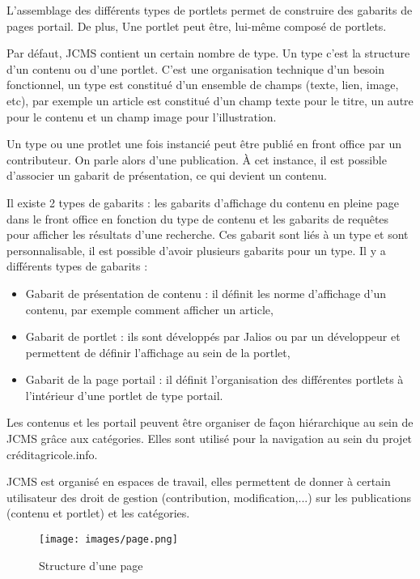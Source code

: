 \documentclass[12pt,a4paper]{article}
\begin{document}
L'assemblage des différents types de portlets permet de construire des gabarits de pages portail. De plus, Une portlet peut être, lui-même composé de portlets.\par 
Par défaut, JCMS contient un certain nombre de type. Un type c'est la structure d'un contenu ou d'une portlet. C'est une organisation technique d'un besoin fonctionnel, un type est constitué d'un ensemble de champs (texte, lien, image, etc), par exemple un article est constitué d'un champ texte pour le titre, un autre pour le contenu et un champ image pour l'illustration.\par 
Un type ou une protlet une fois instancié peut être publié en front office par un contributeur. On parle alors d'une publication. À cet instance, il est possible d'associer un gabarit de présentation, ce qui devient un contenu.\par
Il existe 2 types de gabarits : les gabarits d'affichage du contenu en pleine page dans le front office en fonction du type de contenu et les gabarits de requêtes pour afficher les résultats d'une recherche. Ces gabarit sont liés à un type et sont personnalisable, il est possible d'avoir plusieurs gabarits pour un type. Il y a différents types de gabarits :
\begin{itemize}
\item Gabarit de présentation de contenu : il définit les norme d'affichage d'un contenu, par exemple comment afficher un article,
\item Gabarit de portlet : ils sont développés par Jalios ou par un développeur et permettent de définir l'affichage au sein de la portlet,
\item Gabarit de la page portail : il définit l'organisation des différentes portlets à l'intérieur d'une portlet de type portail.
\end{itemize}\par 
Les contenus et les portail peuvent être organiser de façon hiérarchique au sein de JCMS grâce aux catégories. Elles sont utilisé pour la navigation au sein du projet créditagricole.info.\par
JCMS est organisé en espaces de travail, elles permettent de donner à certain utilisateur des droit de gestion (contribution, modification,...) sur les publications (contenu et portlet) et les catégories.\par 
\begin{figure}[h!]
\centering
\texttt{[image: images/page.png]}
\caption{Structure d'une page}
\end{figure}
\end{document}
